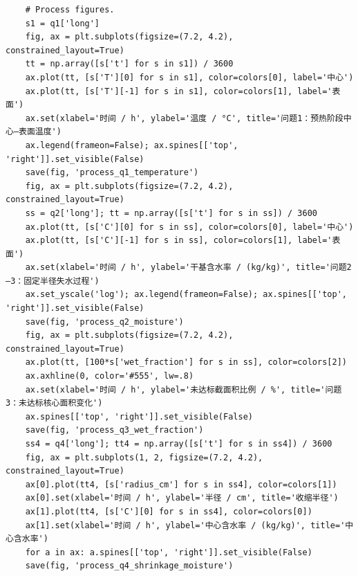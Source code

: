 \begin{verbatim}
    # Process figures.
    s1 = q1['long']
    fig, ax = plt.subplots(figsize=(7.2, 4.2), constrained_layout=True)
    tt = np.array([s['t'] for s in s1]) / 3600
    ax.plot(tt, [s['T'][0] for s in s1], color=colors[0], label='中心')
    ax.plot(tt, [s['T'][-1] for s in s1], color=colors[1], label='表面')
    ax.set(xlabel='时间 / h', ylabel='温度 / °C', title='问题1：预热阶段中心—表面温度')
    ax.legend(frameon=False); ax.spines[['top', 'right']].set_visible(False)
    save(fig, 'process_q1_temperature')
    fig, ax = plt.subplots(figsize=(7.2, 4.2), constrained_layout=True)
    ss = q2['long']; tt = np.array([s['t'] for s in ss]) / 3600
    ax.plot(tt, [s['C'][0] for s in ss], color=colors[0], label='中心')
    ax.plot(tt, [s['C'][-1] for s in ss], color=colors[1], label='表面')
    ax.set(xlabel='时间 / h', ylabel='干基含水率 / (kg/kg)', title='问题2—3：固定半径失水过程')
    ax.set_yscale('log'); ax.legend(frameon=False); ax.spines[['top', 'right']].set_visible(False)
    save(fig, 'process_q2_moisture')
    fig, ax = plt.subplots(figsize=(7.2, 4.2), constrained_layout=True)
    ax.plot(tt, [100*s['wet_fraction'] for s in ss], color=colors[2])
    ax.axhline(0, color='#555', lw=.8)
    ax.set(xlabel='时间 / h', ylabel='未达标截面积比例 / %', title='问题3：未达标核心面积变化')
    ax.spines[['top', 'right']].set_visible(False)
    save(fig, 'process_q3_wet_fraction')
    ss4 = q4['long']; tt4 = np.array([s['t'] for s in ss4]) / 3600
    fig, ax = plt.subplots(1, 2, figsize=(7.2, 4.2), constrained_layout=True)
    ax[0].plot(tt4, [s['radius_cm'] for s in ss4], color=colors[1])
    ax[0].set(xlabel='时间 / h', ylabel='半径 / cm', title='收缩半径')
    ax[1].plot(tt4, [s['C'][0] for s in ss4], color=colors[0])
    ax[1].set(xlabel='时间 / h', ylabel='中心含水率 / (kg/kg)', title='中心含水率')
    for a in ax: a.spines[['top', 'right']].set_visible(False)
    save(fig, 'process_q4_shrinkage_moisture')


\end{verbatim}
